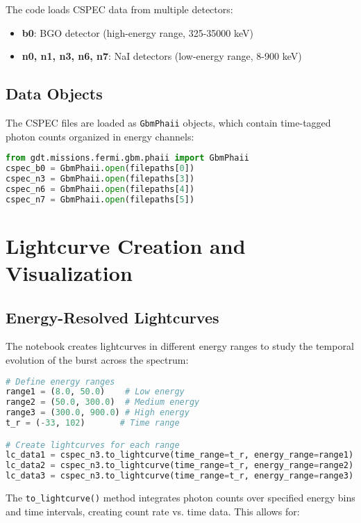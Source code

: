 \documentclass{article}
\begin{document}
The code loads CSPEC data from multiple detectors:
\begin{itemize}
    \item \textbf{b0}: BGO detector (high-energy range, 325-35000 keV)
    \item \textbf{n0, n1, n3, n6, n7}: NaI detectors (low-energy range, 8-900 keV)
\end{itemize}

\subsection{Data Objects}

The CSPEC files are loaded as \texttt{GbmPhaii} objects, which contain time-tagged photon counts organized in energy channels:

\begin{lstlisting}[language=Python]
from gdt.missions.fermi.gbm.phaii import GbmPhaii
cspec_b0 = GbmPhaii.open(filepaths[0]) 
cspec_n3 = GbmPhaii.open(filepaths[3]) 
cspec_n6 = GbmPhaii.open(filepaths[4]) 
cspec_n7 = GbmPhaii.open(filepaths[5])
\end{lstlisting}

\section{Lightcurve Creation and Visualization}

\subsection{Energy-Resolved Lightcurves}

The notebook creates lightcurves in different energy ranges to study the temporal evolution of the burst across the spectrum:

\begin{lstlisting}[language=Python]
# Define energy ranges
range1 = (8.0, 50.0)    # Low energy
range2 = (50.0, 300.0)  # Medium energy  
range3 = (300.0, 900.0) # High energy
t_r = (-33, 102)       # Time range

# Create lightcurves for each range
lc_data1 = cspec_n3.to_lightcurve(time_range=t_r, energy_range=range1)
lc_data2 = cspec_n3.to_lightcurve(time_range=t_r, energy_range=range2)
lc_data3 = cspec_n3.to_lightcurve(time_range=t_r, energy_range=range3)
\end{lstlisting}

The \texttt{to\_lightcurve()} method integrates photon counts over specified energy bins and time intervals, creating count rate vs. time data. This allows for:
\end{document}
